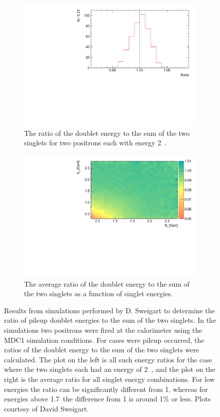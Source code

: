 \begin{figure}[h]
\centering
    \begin{subfigure}[t]{0.45\textwidth}
        \centering
        \includegraphics[width=\textwidth]{p_ratio_2_2_hist}
        \caption{The ratio of the doublet energy to the sum of the two singlets for two positrons each with energy 2~\GeV.}
    \end{subfigure}%
    \hspace{1cm}
    \begin{subfigure}[t]{0.45\textwidth}
        \centering
        \includegraphics[width=\textwidth]{p_ratio_e1_e2}
        \caption{The average ratio of the doublet energy to the sum of the two singlets as a function of singlet energies.}
    \end{subfigure}
\caption[]{Results from simulations performed by D. Sweigart to determine the ratio of pileup doublet energies to the sum of the two singlets. In the simulations two positrons were fired at the calorimeter using the MDC1 simulation conditions. For cases were pileup occurred, the ratios of the doublet energy to the sum of the two singlets were calculated. The plot on the left is all such energy ratios for the case where the two singlets each had an energy of 2~\GeV, and the plot on the right is the average ratio for all singlet energy combinations. For low energies the ratio can be significantly different from 1, whereas for energies above 1.7~\GeV the difference from 1 is around 1\% or less. Plots courtesy of David Sweigart.}

\end{figure}
